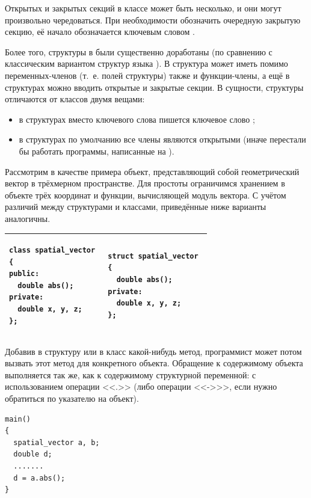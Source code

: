 Открытых и закрытых секций в классе может быть несколько, и они могут произвольно чередоваться. При необходимости
обозначить очередную закрытую секцию, её начало обозначается ключевым словом .

Более того, структуры в  были существенно доработаны (по сравнению с  классическим вариантом 
структур языка ). 
В 
структура может иметь помимо переменных-членов (т.~е. полей структуры) также и функции-члены, а ещё в структурах можно
вводить открытые и закрытые секции. В сущности, структуры отличаются от классов двумя вещами:

\begin{itemize}
\item в структурах вместо ключевого слова  пишется ключевое слово
;
\item в структурах по умолчанию все члены являются открытыми (иначе перестали бы работать программы, написанные на ).
\end{itemize}
Рассмотрим в качестве примера объект, представляющий собой геометрический вектор в трёхмерном пространстве. Для простоты
ограничимся хранением в объекте трёх координат и функции, вычисляющей модуль вектора. С учётом различий между
структурами и классами, приведённые ниже варианты аналогичны.
\begin{center}
\begin{tabular}{|p{}|p{}|}
\hline
\begin{lstlisting}
class spatial_vector 
{
public:
  double abs();
private:
  double x, y, z;
};
\end{lstlisting}
&
\begin{lstlisting}
struct spatial_vector 
{
  double abs();
private:
  double x, y, z;
};
\end{lstlisting}
\\\hline
\end{tabular}
\end{center}

Добавив в структуру или в класс какой-нибудь метод, программист может потом вызвать этот метод для конкретного объекта.
Обращение к содержимому объекта выполняется так же, как к содержимому структурной переменной: с использованием операции
<<.>> (либо операции <<->{}>>, если нужно обратиться по указателю на объект).
\begin{lstlisting}
main() 
{
  spatial_vector a, b;
  double d;
  .......
  d = a.abs();
}
\end{lstlisting}

